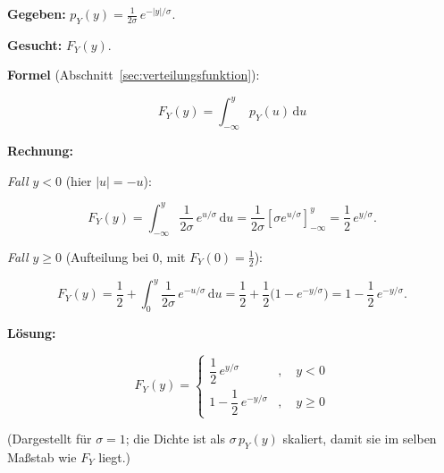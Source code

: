 \begin{beispiel}

\textbf{Gegeben:} $p_Y(y) = \tfrac{1}{2\sigma}\, e^{-|y|/\sigma}$.

\textbf{Gesucht:} $F_Y(y)$.

\textbf{Formel} (Abschnitt~\ref{sec:verteilungsfunktion}):

$$
F_Y(y) = \int_{-\infty}^{y} p_Y(u)\,\mathrm{d}u
$$

\textbf{Rechnung:}

\emph{Fall $y < 0$} (hier $|u| = -u$):

$$
F_Y(y) = \int_{-\infty}^{y} \frac{1}{2\sigma}\, e^{u/\sigma}\,\mathrm{d}u
= \frac{1}{2\sigma} \left[\sigma e^{u/\sigma}\right]_{-\infty}^{y}
= \frac{1}{2}\, e^{y/\sigma}.
$$

\emph{Fall $y \geq 0$} (Aufteilung bei $0$, mit $F_Y(0) = \tfrac12$):

$$
F_Y(y) = \frac{1}{2} + \int_0^{y} \frac{1}{2\sigma}\, e^{-u/\sigma}\,\mathrm{d}u
= \frac{1}{2} + \frac{1}{2}\bigl(1 - e^{-y/\sigma}\bigr)
= 1 - \frac{1}{2}\, e^{-y/\sigma}.
$$

\textbf{Lösung:}

$$
\boxed{\;F_Y(y) = \begin{cases}
\dfrac{1}{2}\, e^{y/\sigma} & , \quad y < 0 \\[8pt]
1 - \dfrac{1}{2}\, e^{-y/\sigma} & , \quad y \geq 0 \end{cases}\;}
$$

\begin{center}
\end{center}

(Dargestellt für $\sigma = 1$; die Dichte ist als $\sigma\, p_Y(y)$ skaliert,
damit sie im selben Maßstab wie $F_Y$ liegt.)

\end{beispiel}

